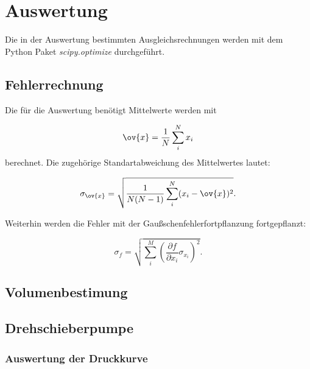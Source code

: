 \section{Auswertung}

Die in der Auswertung bestimmten Ausgleichsrechnungen werden mit
dem Python Paket \emph{scipy.optimize}\cite{scipy} durchgeführt.

\subsection{Fehlerrechnung}

Die für die Auswertung benötigt Mittelwerte werden mit

\begin{equation}
  \label{eq: mittel}
  \ov{x}=\frac{1}{N}\sum_i^N x_i
\end{equation}
berechnet. Die zugehörige Standartabweichung des Mittelwertes lautet:

\begin{equation}
  \label{eq: standartabweichung}
  \sigma_{\ov{x}}=\sqrt{ \frac{1}{N(N-1)} \sum_i^N (x_i-\ov{x})^2}.
\end{equation}

Weiterhin werden die Fehler mit der Gaußschenfehlerfortpflanzung fortgepflanzt:

\begin{equation}
  \label{eq: gauss_fehler}
  \sigma_f= \sqrt{ \sum_i^M \left(\frac{\partial f}{\partial x_i} \sigma_{x_i}\right)^2}.
\end{equation}

\subsection{Volumenbestimung}


\subsection{Drehschieberpumpe}

\subsubsection{Auswertung der Druckkurve}
